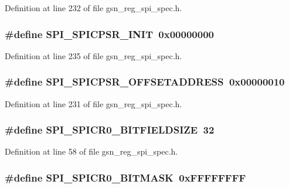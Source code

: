 Definition at line 232 of file gsn\_\-reg\_\-spi\_\-spec.h.

\hypertarget{a00573_a58071373b955cac6e5ec266d74a1a5f0}{
\subsubsection[{SPI\_\-SPICPSR\_\-INIT}]{\setlength{\rightskip}{0pt plus 5cm}\#define SPI\_\-SPICPSR\_\-INIT~0x00000000}}
\label{a00573_a58071373b955cac6e5ec266d74a1a5f0}


Definition at line 235 of file gsn\_\-reg\_\-spi\_\-spec.h.

\hypertarget{a00573_a32969f7dce71cf4e13f020e7b349b4d8}{
\subsubsection[{SPI\_\-SPICPSR\_\-OFFSETADDRESS}]{\setlength{\rightskip}{0pt plus 5cm}\#define SPI\_\-SPICPSR\_\-OFFSETADDRESS~0x00000010}}
\label{a00573_a32969f7dce71cf4e13f020e7b349b4d8}


Definition at line 231 of file gsn\_\-reg\_\-spi\_\-spec.h.

\hypertarget{a00573_ab7d428619c0ccdc3925ad97544a53bdf}{
\subsubsection[{SPI\_\-SPICR0\_\-BITFIELDSIZE}]{\setlength{\rightskip}{0pt plus 5cm}\#define SPI\_\-SPICR0\_\-BITFIELDSIZE~32}}
\label{a00573_ab7d428619c0ccdc3925ad97544a53bdf}


Definition at line 58 of file gsn\_\-reg\_\-spi\_\-spec.h.

\hypertarget{a00573_ae23457b72791ce11590a9508deb50279}{
\subsubsection[{SPI\_\-SPICR0\_\-BITMASK}]{\setlength{\rightskip}{0pt plus 5cm}\#define SPI\_\-SPICR0\_\-BITMASK~0xFFFFFFFF}}
\label{a00573_ae23457b72791ce11590a9508deb50279}


